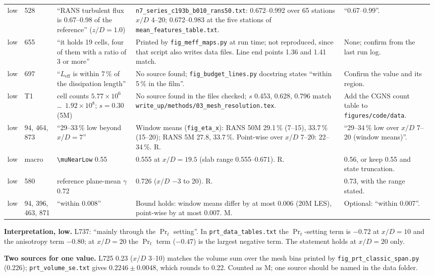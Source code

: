 \documentclass[10pt,a4paper]{article}
\newcommand*{\Leff}{L_{\mathrm{eff}}}
\newcommand{\vM}{\textsf{M}}
\newcommand{\vR}{\textsf{R}}
\begin{document}
{\begin{longtable}{@{}P{9mm} P{9mm} P{39mm} P{53mm} P{47mm}@{}}
low & 528 & ``RANS turbulent flux is 0.67--0.98 of the reference'' ($z/D=1.0$)
 & \texttt{n7\_series\_c193b\_b010\_rans50.txt}: 0.672--0.992 over 65 stations $x/D$ 4--20; 0.672--0.983 at the five
   stations of \texttt{mean\_features\_table.txt}.
 & ``0.67--0.99''. \\
low & 655 & ``it holds 19 cells, four of them with a ratio of 3 or more''
 & Printed by \texttt{fig\_meff\_maps.py} at run time; not reproduced, since that script also writes data files.
   Line end points 1.36 and 1.41 match.
 & None; confirm from the last run log. \\
low & 697 & ``$\Leff$ is within 7\,\% of the dissipation length''
 & No source found; \texttt{fig\_budget\_lines.py} docstring states ``within 5\,\% in the film''.
 & Confirm the value and its region. \\
low & T1 & cell counts $5.77\times10^6$ \dots\ $1.92\times10^8$; $s=0.30$ (5M)
 & No source found in the files checked; $s$ 0.453, 0.628, 0.796 match \texttt{write\_up/methods/03\_mesh\_resolution.tex}.
 & Add the CGNS count table to \texttt{figures/code/data}. \\
low & 94, 464, 873 & ``29--33\,\% low beyond $x/D=7$''
 & Window means (\texttt{fig\_eta\_x}): RANS 50M 29.1\,\% (7--15), 33.7\,\% (15--20); RANS 5M 27.8, 33.7\,\%. Point-wise
   over $x/D$ 7--20: 22--34\,\%. \vR.
 & ``29--34\,\% low over $x/D$ 7--20 (window means)''. \\
low & macro & \verb|\muNearLow| 0.55
 & 0.555 at $x/D=19.5$ (slab range 0.555--0.671). \vR.
 & 0.56, or keep 0.55 and state truncation. \\
low & 580 & reference plane-mean $\gamma$ 0.72
 & 0.726 ($x/D$ $-3$ to 20). \vR.
 & 0.73, with the range stated. \\
low & 94, 396, 463, 871 & ``within 0.008''
 & Bound holds: window means differ by at most 0.006 (20M LES), point-wise by at most 0.007. \vM.
 & Optional: ``within 0.007''. \\
\bottomrule
\end{longtable}}

\textbf{Interpretation, low.} L737: ``mainly through the $\Pr_t$ setting''. In \texttt{prt\_data\_tables.txt} the
$\Pr_t$-setting term is $-0.72$ at $x/D=10$ and the anisotropy term $-0.80$; at $x/D=20$ the $\Pr_t$ term ($-0.47$)
is the largest negative term. The statement holds at $x/D=20$ only.

\textbf{Two sources for one value.} L725 0.23 ($x/D$ 3--10) matches the volume sum over the mesh bins printed by
\texttt{fig\_prt\_classic\_span.py} (0.226); \texttt{prt\_volume\_se.txt} gives $0.2246\pm0.0048$, which rounds to
0.22. Counted as \vM; one source should be named in the data folder.
\end{document}
